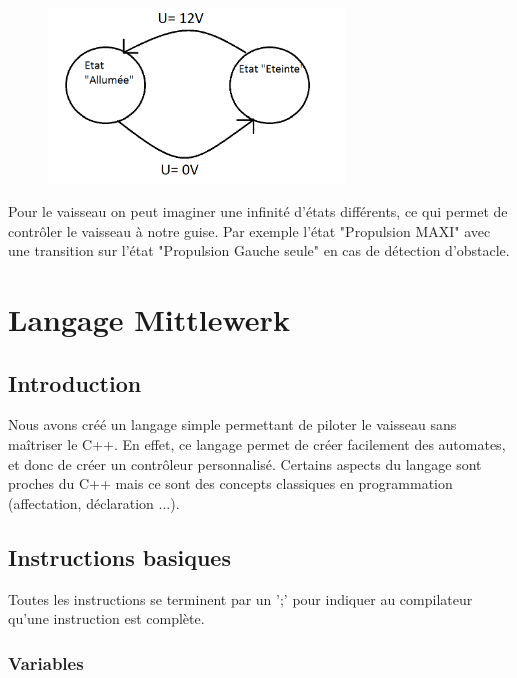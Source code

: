 \documentclass[a4paper,11pt]{article}
\begin{document}
\begin{figure}[!h]
            \begin{center}
                \includegraphics[width=0.7\textwidth]{img/automatelas.png}
            \end{center}
\end{figure}

Pour le vaisseau on peut imaginer une infinité d'états différents, ce qui permet de contrôler le vaisseau à notre guise. Par exemple l'état "Propulsion MAXI" avec une transition sur l'état "Propulsion Gauche seule" en cas de détection d'obstacle.

\section{Langage Mittlewerk}

\subsection{Introduction}
Nous avons créé un langage simple permettant de piloter le vaisseau sans maîtriser le C++. En effet, ce langage permet de créer facilement des automates, et donc de créer un contrôleur personnalisé.
Certains aspects du langage sont proches du C++ mais ce sont des concepts classiques en programmation (affectation, déclaration ...).

\subsection{Instructions basiques}
Toutes les instructions se terminent par un ';' pour indiquer au compilateur qu'une instruction est complète.

\subsubsection{Variables}
\end{document}
